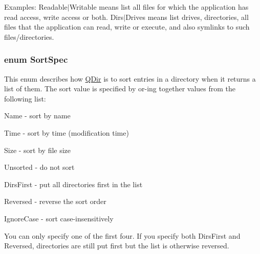 Examples\-: {\ttfamily Readable$|$\-Writable} means list all files for which the application has read access, write access or both. {\ttfamily Dirs$|$\-Drives} means list drives, directories, all files that the application can read, write or execute, and also symlinks to such files/directories. \hypertarget{class_q_dir_ab098a8b38ab309d7073f6920c4811af4}{
\subsubsection[{Sort\-Spec}]{\setlength{\rightskip}{0pt plus 5cm}enum {\bf Sort\-Spec}}}\label{class_q_dir_ab098a8b38ab309d7073f6920c4811af4}
This enum describes how \hyperlink{class_q_dir}{Q\-Dir} is to sort entries in a directory when it returns a list of them. The sort value is specified by or-\/ing together values from the following list\-: 
\begin{DoxyItemize}
\item {\ttfamily Name} -\/ sort by name 
\item {\ttfamily Time} -\/ sort by time (modification time) 
\item {\ttfamily Size} -\/ sort by file size 
\item {\ttfamily Unsorted} -\/ do not sort


\item {\ttfamily Dirs\-First} -\/ put all directories first in the list 
\item {\ttfamily Reversed} -\/ reverse the sort order 
\item {\ttfamily Ignore\-Case} -\/ sort case-\/insensitively


\end{DoxyItemize}

You can only specify one of the first four. If you specify both {\ttfamily Dirs\-First} and {\ttfamily Reversed}, directories are still put first but the list is otherwise reversed. 

